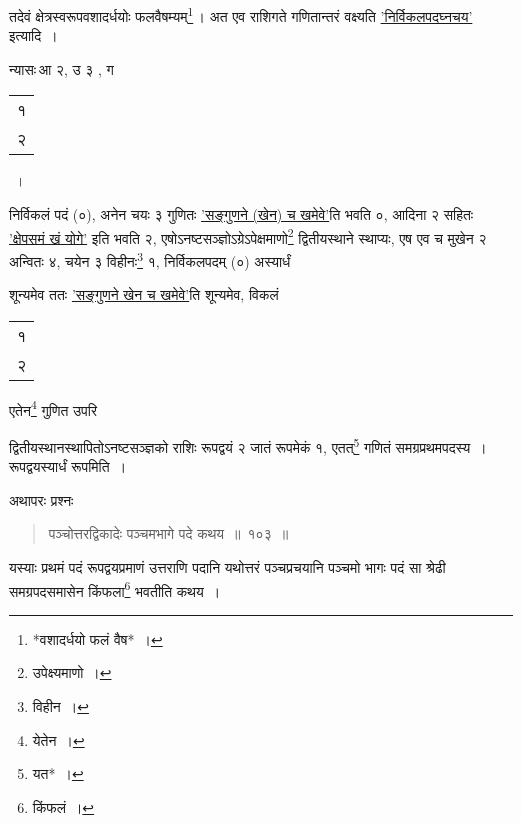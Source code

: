 \documentclass[10pt, openany]{book}
\begin{document}
\renewcommand*{\arraystretch}{0.7}
\vspace{3mm}

{तदेवं क्षेत्रस्वरूपवशादर्धयोः फलवैषम्यम्\renewcommand{\thefootnote}{२}\footnote{*वशादर्धयो फलं वैष*~।}\,। अत एव राशिगते
गणितान्तरं वक्ष्यति}
{\hyperref[89]{'निर्विकलपदघ्नचय'} इत्यादि~।}
\vspace{3mm}

{न्यासः\textendash \,\hspace{4mm}आ २, उ ३ , ग \begin{tabular}{|c|} १\\ २\\\hline \end{tabular}~।}
\vspace{3mm}

{निर्विकलं पदं (०), अनेन चयः ३ गुणितः \hyperref[21]{'सङ्गुणने (खेन) च खमेवे'}ति भवति
०,}
{आदिना २ सहितः \hyperref[21]{'क्षेपसमं खं योगे'} इति भवति २,
एषोऽनष्टसञ्ज्ञोऽग्रेऽपेक्षमाणो\renewcommand{\thefootnote}{३}\footnote{उपेक्ष्यमाणो~।} द्वितीयस्थाने}
{स्थाप्यः, एष एव च मुखेन २ अन्वितः ४, चयेन ३ विहीनः\renewcommand{\thefootnote}{४}\footnote{विहीन~।} १, निर्विकलपदम्
(०) अस्यार्धं}
{शून्यमेव ततः \hyperref[21]{'सङ्गुणने खेन च खमेवे'}ति शून्यमेव, विकलं \begin{tabular}{|c|}१ \\ २\\\hline \end{tabular}
एतेन\renewcommand{\thefootnote}{५}\footnote{येतेन~।} गुणित उपरि}
{द्वितीयस्थानस्थापितोऽनष्टसञ्ज्ञको राशिः रूपद्वयं २ जातं रूपमेकं १,
एतत्\renewcommand{\thefootnote}{६}\footnote{यत*~।} गणितं समग्रप्रथमपदस्य~। रूपद्वयस्यार्धं रूपमिति~।}
\vspace{3mm}

{अथापरः प्रश्नः\textemdash}

\begin{quote}

{\eg पञ्चोत्तरद्विकादेः पञ्चमभागे पदे कथय~॥~१०३~॥}\end{quote}

{यस्याः प्रथमं पदं रूपद्वयप्रमाणं उत्तराणि पदानि यथोत्तरं पञ्चप्रचयानि
पञ्चमो}
{भागः पदं सा श्रेढी समग्रपदसमासेन किंफला\renewcommand{\thefootnote}{७}\footnote{किंफलं~।} भवतीति कथय~।}
\vspace{3mm}
\end{document}
